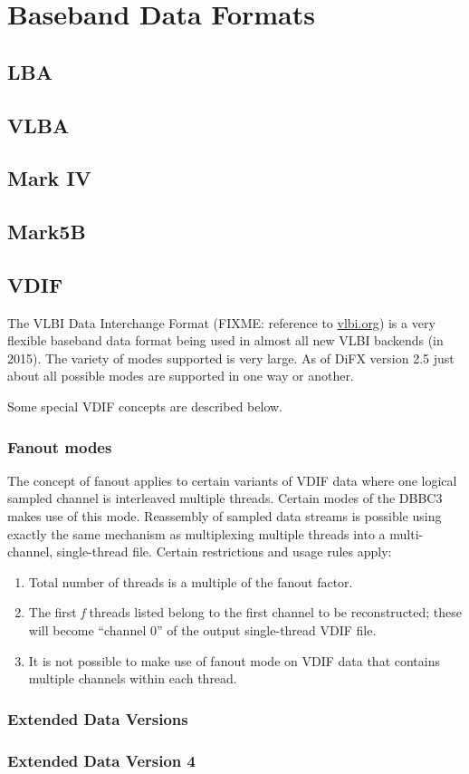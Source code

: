 \section{Baseband Data Formats}

\subsection{LBA} \label{sec:lbaformat}

\subsection{VLBA} \label{sec:vlbaformat}

\subsection{Mark IV} \label{sec:markivformat}

\subsection{Mark5B} \label{sec:mark5bformat}

\subsection{VDIF} \label{sec:vdifformat}

The VLBI Data Interchange Format (FIXME: reference to \url{vlbi.org}) is a very flexible baseband data format being used in almost all new VLBI backends (in 2015).
The variety of modes supported is very large.
As of DiFX version 2.5 just about all possible modes are supported in one way or another.

Some special VDIF concepts are described below.

\subsubsection{Fanout modes} \label{sec:vdiffanout}

The concept of fanout applies to certain variants of VDIF data where one logical sampled channel is interleaved multiple threads.
Certain modes of the DBBC3 makes use of this mode.
Reassembly of sampled data streams is possible using exactly the same mechanism as multiplexing multiple threads into a multi-channel, single-thread file.
Certain restrictions and usage rules apply:
\begin{enumerate}
\item Total number of threads is a multiple of the fanout factor.
\item The first {\em f} threads listed belong to the first channel to be reconstructed; these will become ``channel 0'' of the output single-thread VDIF file.
\item It is not possible to make use of fanout mode on VDIF data that contains multiple channels within each thread.
\end{enumerate}

\subsubsection{Extended Data Versions} \label{sec:vdifedv}

\subsubsection{Extended Data Version 4} \label{sec:vdifedv4}


